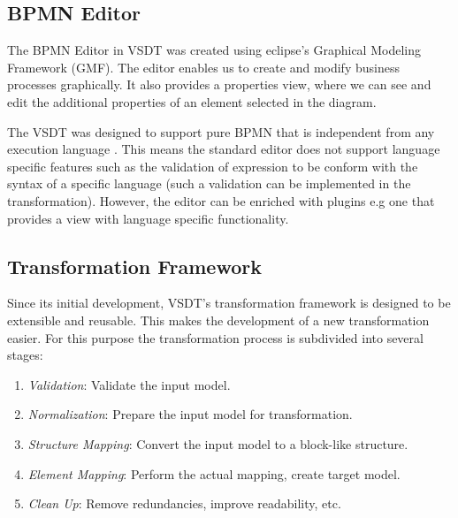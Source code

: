\subsection{BPMN Editor}
The BPMN Editor in VSDT was created using eclipse's Graphical Modeling Framework (GMF). The editor enables us to create and modify business processes graphically. It also provides a properties view, where we can see and edit the additional properties of an element selected in the diagram. 

The VSDT was designed to support pure BPMN that is independent from any execution language \cite{TKAH08}. This means the standard editor does not support language specific features such as the validation of expression to be conform with the syntax of a specific language (such a validation can be implemented in the transformation). However, the editor can be enriched with plugins e.g one that provides a view with language specific functionality.  


\subsection{Transformation Framework}
Since its initial development, VSDT's transformation framework is designed to be extensible and reusable. This makes the development of a new transformation easier. For this purpose the transformation process is subdivided into several stages: 
\begin{enumerate}
	\item \textit{Validation}: Validate the input model.
	\item \textit{Normalization}: Prepare the input model for transformation.
	\item \textit{Structure Mapping}: Convert the input model to a block-like structure.
	\item \textit{Element Mapping}: Perform the actual mapping, create target model.
	\item \textit{Clean Up}: Remove redundancies, improve readability, etc.
\end{enumerate}

